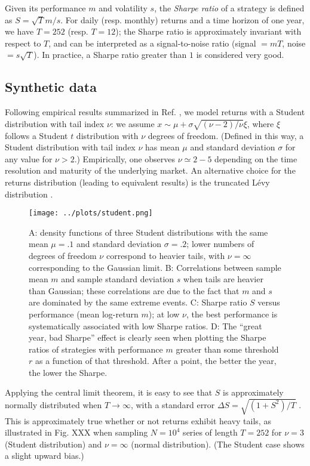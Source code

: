 \documentclass[
reprint,
amsmath,amssymb,
aps,
]{revtex4-2}
\begin{document}
Given its performance $m$ and volatility $s$, the \emph{Sharpe ratio} of a strategy is defined as $S = \sqrt{T} m/s$.  
For daily (resp. monthly) returns and a time horizon of one year, we have $T = 252$ (resp. $T = 12$); the Sharpe ratio is approximately invariant with respect to $T$, and can be interpreted as a signal-to-noise ratio (signal $=mT$, noise $=s\sqrt{T}$). 
In practice, a Sharpe ratio greater than $1$ is considered very good.

\subsection{Synthetic data}

Following empirical results summarized in Ref. \cite{bouchaudTheory2003}, we model returns with a Student distribution with tail index $\nu$: we assume $x \sim \mu + \sigma\sqrt{(\nu - 2)/\nu} \xi$, where $\xi$ follows a Student $t$ distribution with $\nu$ degrees of freedom. 
(Defined in this way, a Student distribution with tail index $\nu$ has mean $\mu$ and standard deviation $\sigma$ for any value for $\nu > 2$.)
Empirically, one observes $\nu \simeq 2-5$ depending on the time resolution and maturity of the underlying market. 
An alternative choice for the returns distribution (leading to equivalent results) is the truncated Lévy distribution \cite{mantegnaStochastic1994}.

\begin{figure*}
    \texttt{[image: ../plots/student.png]}
    \caption{
        A: density functions of three Student distributions with the same mean $\mu = .1$ and standard deviation $\sigma = .2$; lower numbers of degrees of freedom $\nu$ correspond to heavier tails, with $\nu = \infty$ corresponding to the Gaussian limit. 
        B: Correlations between sample mean $m$ and sample standard deviation $s$ when tails are heavier than Gaussian; these correlations are due to the fact that $m$ and $s$ are dominated by the same extreme events. 
        C: Sharpe ratio $S$ versus performance (mean log-return $m$); at low $\nu$, the best performance is systematically associated with low Sharpe ratios. 
        D: The ``great year, bad Sharpe'' effect is clearly seen when plotting the Sharpe ratios of strategies with performance $m$ greater than some threshold $r$ as a function of that threshold. After a point, the better the year, the lower the Sharpe.}
\end{figure*}

Applying the central limit theorem, it is easy to see that $S$ is approximately normally distributed when $T\to\infty$, with a standard error $\Delta S = \sqrt{(1+S^2)/T}$ \cite{loStatistics2002}. This is approximately true whether or not returns exhibit heavy tails, as illustrated in Fig. XXX when sampling $N = 10^4$ series of length $T = 252$ for $\nu = 3$ (Student distribution) and $\nu = \infty$ (normal distribution). (The Student case shows a slight upward bias.)
\end{document}

